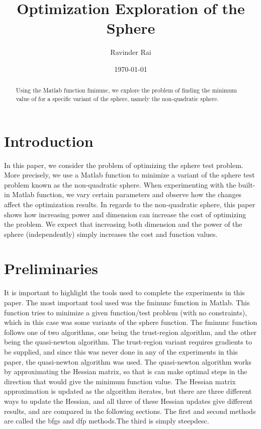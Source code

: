 \documentclass[sigconf, 10pt]{acmart}
\title{\textbf{Optimization Exploration of the Sphere}}
\author{Ravinder Rai}
\date{\today}
\begin{document}
 



\begin{abstract}
Using the Matlab function fminunc, we explore the problem of finding the minimum value of for a specific variant of the sphere, namely the non-quadratic sphere.
\end{abstract}
\maketitle

\section{Introduction}
\label{sec:intro}

In this paper, we consider the problem of optimizing the sphere test problem. More precisely, we use a Matlab function to minimize a variant of the sphere test problem known as the non-quadratic sphere. When experimenting with the built-in Matlab function, we vary certain parameters and observe how the changes affect the optimization results. In regards to the non-quadratic sphere, this paper shows how increasing power and dimension can increase the cost of optimizing the problem. We expect that increasing both dimension and the power of the sphere (independently) simply increases the cost and function values. 


\section{Preliminaries}
\label{sec:pre}
It is important to highlight the tools used to complete the experiments in this paper. The most important tool used was the fminunc function in Matlab. This function tries to minimize a given function/test problem (with no constraints), which in this case was some variants of the sphere function. The fminunc function follows one of two algorithms, one being the trust-region algorithm, and the other being the quasi-newton algorithm. The trust-region variant requires gradients to be supplied, and since this was never done in any of the experiments in this paper, the quasi-newton algorithm was used. The quasi-newton algorithm works by approximating the Hessian matrix, so that is can make optimal steps in the direction that would give the minimum function value. The Hessian matrix approximation is updated as the algorithm iterates, but there are three different ways to update the Hessian, and all three of these Hessian updates give different results, and are compared in the following sections. The first and second methods are called the bfgs and dfp methods.The third is simply steepdesc.
\end{document}
